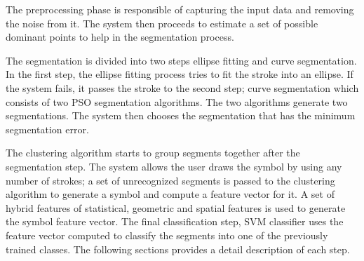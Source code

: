 \documentclass[a4paper,10pt]{IEEEconf}
\begin{document}
The preprocessing phase is responsible of capturing the input data and removing the noise from it. The system then proceeds to estimate a set of possible dominant points to help in the segmentation process. %
  
The segmentation is divided into two steps ellipse fitting and curve segmentation. In the first step, the ellipse fitting process tries to fit the stroke into an ellipse. If the system fails, it passes the stroke to the second step; curve segmentation which consists of two PSO segmentation algorithms. The two algorithms generate two segmentations. The system then chooses the segmentation that has the minimum segmentation error.%

 The clustering algorithm starts to group segments together after the segmentation step. The system allows the user draws the symbol by using any number of strokes; a set of unrecognized segments is passed to the clustering algorithm to generate a symbol and compute a feature vector for it. A set of hybrid features of statistical, geometric and spatial features is used to generate the symbol feature vector. The final classification step, SVM classifier uses the feature vector computed to classify the segments into one of the previously trained classes. The following sections provides a detail description of each step.%
 
\end{document}
